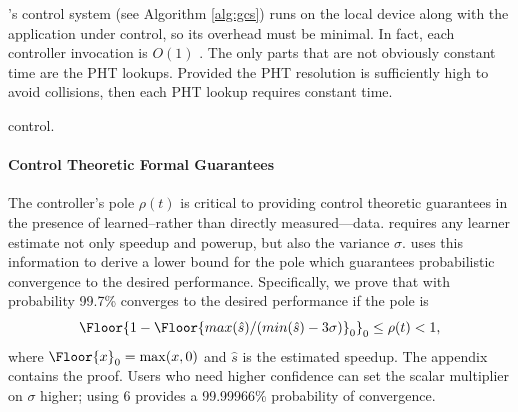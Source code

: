 \SYSTEM{}'s control system (see Algorithm \ref{alg:gcs}) runs on the
local device along with the application under control, so its overhead
must be minimal.  In fact, each controller invocation is $O(1)$ .  The
only parts that are not obviously constant time are the PHT lookups.
Provided the PHT resolution is sufficiently high to avoid collisions,
then each PHT lookup requires constant time.
\begin{algorithm}[t]
\caption{\SYSTEM{} control.}
\label{alg:gcs}
\end{algorithm}

\paragraph{Control Theoretic Formal Guarantees}

The controller's pole $\rho(t)$ is critical to providing control
theoretic guarantees in the presence of learned--rather than directly
measured---data.  \SYSTEM{} requires any learner estimate not only
speedup and powerup, but also the variance $\sigma$.  \SYSTEM{} uses
this information to derive a lower bound for the pole which guarantees
probabilistic convergence to the desired performance. Specifically, we
prove that with probability 99.7\% \SYSTEM{} converges to the desired
performance if the pole is
$$\Floor{1- \Floor{max(\hat{s})/(min(\hat{s}) - 3\sigma)}_0}_0 \leq \rho(t)
< 1,$$ where $\Floor{x}_0 = \max(x,0)$ and $\hat{s}$ is the estimated
speedup. The appendix contains the proof. Users who need higher
confidence can set the scalar multiplier on $\sigma$ higher; \eg{}
using $6$ provides a 99.99966\% probability of convergence.

